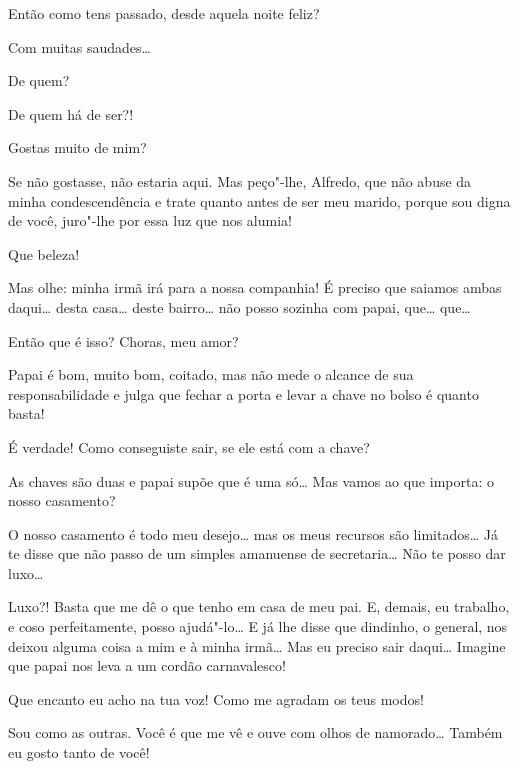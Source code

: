  
Então como tens passado, desde aquela noite feliz?

  Com muitas saudades\ldots{}

 De quem?

 De quem há de ser?!

 Gostas muito de
mim?

 Se não gostasse, não estaria aqui. Mas peço"-lhe,
Alfredo, que não abuse da minha
condescendência e trate quanto antes de ser meu
marido, porque sou digna de você, juro"-lhe por essa
luz que nos alumia!

 Que beleza!

 Mas olhe: minha
irmã irá para a nossa companhia! É
preciso que saiamos ambas daqui\ldots{} desta casa\ldots{} deste
bairro\ldots{} não posso sozinha com papai, que\ldots{} que\ldots{} 

 Então que é isso? Choras, meu amor?

 Papai é
bom, muito bom, coitado, mas não mede o
alcance de sua responsabilidade e julga que fechar a porta e
levar a chave no bolso é quanto basta!

 É verdade! Como
conseguiste sair, se ele está com a chave?

 As chaves
são duas e papai supõe que
é uma só\ldots{}  Mas
vamos ao que importa: o nosso casamento?

 O nosso casamento
é todo meu desejo\ldots{} 
mas os meus recursos são limitados\ldots{} Já te
disse que não passo de um simples amanuense de
secretaria\ldots{} Não te posso dar luxo\ldots{}

 Luxo?! Basta que
me dê o que tenho em casa de meu pai. E, demais, eu
trabalho, e coso perfeitamente, posso ajudá"-lo\ldots{} E já
lhe disse que dindinho, o general, nos deixou alguma coisa a
mim e à minha irmã\ldots{} Mas eu
preciso sair daqui\ldots{} Imagine que papai nos leva a um cordão
carnavalesco!

 Que encanto eu
acho na tua voz! Como me agradam os teus modos!

 Sou como as
outras. Você é que me vê e ouve com
olhos de namorado\ldots{} Também eu gosto tanto de
você!

